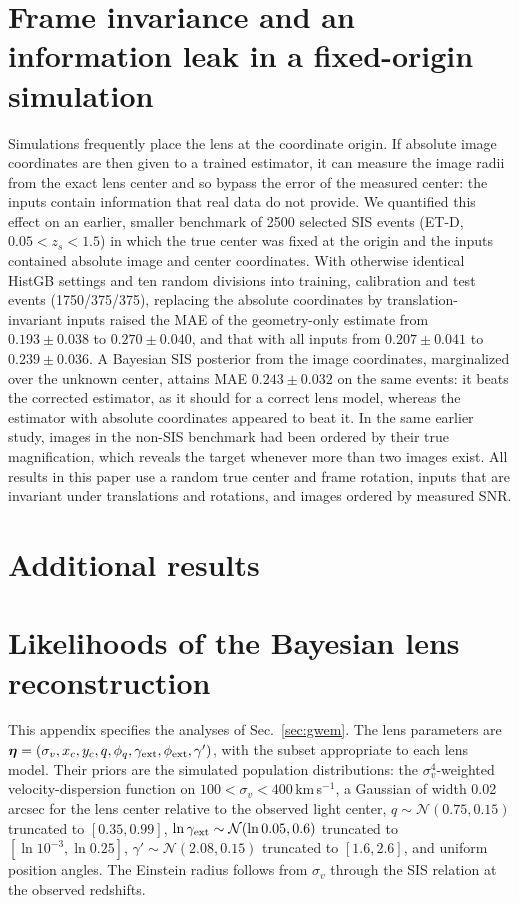 \section{Frame invariance and an information leak in a fixed-origin simulation}
\label{app:leak}
Simulations frequently place the lens at the coordinate origin. If absolute image coordinates are then given to a trained estimator, it can measure the image radii from the exact lens center and so bypass the error of the measured center: the inputs contain information that real data do not provide. We quantified this effect on an earlier, smaller benchmark of 2500 selected SIS events (ET-D, $0.05<z_s<1.5$) in which the true center was fixed at the origin and the inputs contained absolute image and center coordinates. With otherwise identical HistGB settings and ten random divisions into training, calibration and test events (1750/375/375), replacing the absolute coordinates by translation-invariant inputs raised the MAE of the geometry-only estimate from $0.193\pm0.038$ to $0.270\pm0.040$, and that with all inputs from $0.207\pm0.041$ to $0.239\pm0.036$. A Bayesian SIS posterior from the image coordinates, marginalized over the unknown center, attains MAE $0.243\pm0.032$ on the same events: it beats the corrected estimator, as it should for a correct lens model, whereas the estimator with absolute coordinates appeared to beat it. In the same earlier study, images in the non-SIS benchmark had been ordered by their true magnification, which reveals the target whenever more than two images exist. All results in this paper use a random true center and frame rotation, inputs that are invariant under translations and rotations, and images ordered by measured SNR.

\section{Additional results}
\label{app:extra}


\section{Likelihoods of the Bayesian lens reconstruction}
\label{app:gwemlike}
This appendix specifies the analyses of Sec.~\ref{sec:gwem}. The lens parameters are $\boldsymbol\eta=(\sigma_v,x_c,y_c,q,\phi_q,\gamma_{\rm ext},\phi_{\rm ext},\gamma')$, with the subset appropriate to each lens model. Their priors are the simulated population distributions: the $\sigma_v^4$-weighted velocity-dispersion function on $100<\sigma_v<400$\,km\,s$^{-1}$, a Gaussian of width 0.02\,arcsec for the lens center relative to the observed light center, $q\sim\mathcal N(0.75,0.15)$ truncated to $[0.35,0.99]$, $\ln\gamma_{\rm ext}\sim\mathcal N(\ln0.05,0.6)$ truncated to $[\ln10^{-3},\ln0.25]$, $\gamma'\sim\mathcal N(2.08,0.15)$ truncated to $[1.6,2.6]$, and uniform position angles. The Einstein radius follows from $\sigma_v$ through the SIS relation at the observed redshifts.

